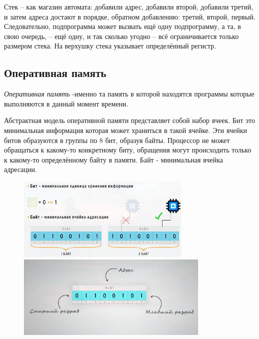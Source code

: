 	\par Стек – как магазин автомата: добавили адрес, добавили второй, добавили третий, и затем адреса достают в порядке, обратном добавлению: третий, второй, первый. Следовательно, подпрограмма может вызвать ещё одну подпрограмму, а та, в свою очередь, – ещё одну, и так сколько угодно – всё ограничивается только размером стека. На верхушку стека указывает определённый регистр.
	
	\subsection{Оперативная память}
	\par \textit{Оперативная память} -именно та память в которой находятся программы которые выполняются в данный момент времени.
	
	\par Абстрактная модель оперативной памяти представляет собой набор ячеек. Бит это минимальная информация которая может храниться в такой ячейке. Эти ячейки битов образуются в группы по 8 бит, образуя байты. Процессор не может обращаться к какому-то конкретному биту, обращения могут происходить только к какому-то определённому байту в памяти. Байт - минимальная ячейка адресации.
	
	\begin{figure}[h]
		\centering
		\begin{minipage}{0.45\textwidth}
			\centering
			\includegraphics[height=4cm]{img/1.7} 
			\captionsetup{font=footnotesize} 
			\caption*{} 
		\end{minipage}
		\hfill
		\begin{minipage}{0.45\textwidth}
			\centering
			\includegraphics[height=4cm]{img/1.8} 
			\captionsetup{font=footnotesize} 
			\caption*{} 
		\end{minipage}
	\end{figure}
	
